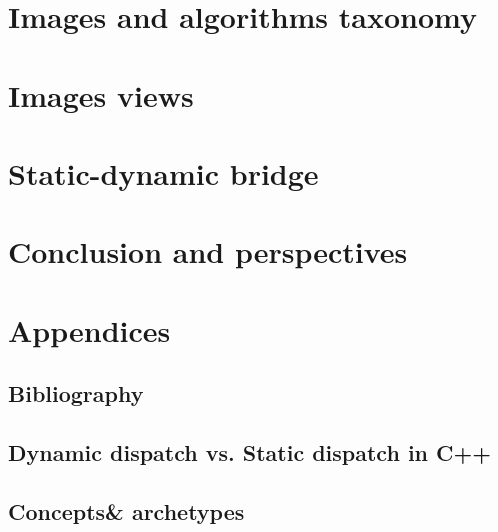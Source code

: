 \documentclass[11pt]{book}
\begin{document}


\cleardoublepage


\part{Images and algorithms taxonomy}
\label{part.image_and_algorithms_taxonomy}



\cleardoublepage


\part{Images views}
\label{part.image_views}



\cleardoublepage


\part{Static-dynamic bridge}
\label{part.static_dynamic_bridge}



\cleardoublepage


\part{Conclusion and perspectives}
\label{part.conclusion_and_perspecitves}



\cleardoublepage


\part{Appendices}
\label{part.annexes}

\appendix

\chapter{Bibliography}
\label{chap.bibliography}




\chapter{Dynamic dispatch vs. Static dispatch in C++}
\label{appendix.dispatch.dyn.static}



\chapter{Concepts\& archetypes}
\label{appendix.concepts.and.archetypes}


\end{document}
